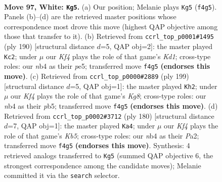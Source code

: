 \documentclass[11pt]{article}
\begin{document}
\clearpage

\begin{figure}[p]\centering
\begin{subfigure}{0.46\textwidth}\centering
\resizebox{\linewidth}{!}{%
\newchessgame
\chessboard[
  setfen={8/7k/8/7b/1n1B1K2/8/5P2/8 w - - 39 97},
  showmover=false,
  pgfstyle=straightmove, color=movearrow, markmove={f4-g5}
]}
\caption{}
\end{subfigure}\hfill
\begin{subfigure}{0.46\textwidth}\centering
\resizebox{\linewidth}{!}{%
\newchessgame
\chessboard[
  setfen={8/2k5/8/3Bp3/8/4bP2/8/3K4 w - - 13 96},
  showmover=false,
  pgfstyle=straightmove, color=movearrow, markmove={d1-c2}
]}
\caption{}
\end{subfigure}
\\[4pt]
\begin{subfigure}{0.46\textwidth}\centering
\resizebox{\linewidth}{!}{%
\newchessgame
\chessboard[
  setfen={8/2b5/1p6/1P1B4/6K1/8/8/6k1 b - - 14 100},
  showmover=false,
  pgfstyle=straightmove, color=movearrow, markmove={g1-h2}
]}
\caption{}
\end{subfigure}\hfill
\begin{subfigure}{0.46\textwidth}\centering
\resizebox{\linewidth}{!}{%
\newchessgame
\chessboard[
  setfen={8/k7/8/1K6/1P6/5B2/P7/2b5 w - - 25 91},
  showmover=false,
  pgfstyle=straightmove, color=movearrow, markmove={b5-a4}
]}
\caption{}
\end{subfigure}
\caption{\textbf{Move 97, White: \texttt{Kg5}.} (a) Our position; Melanie plays \texttt{Kg5} (\texttt{f4g5}). Panels (b)--(d) are the retrieved master positions whose correspondence most drove this move (highest QAP objective among those that transfer to it). (b) Retrieved from \texttt{ccrl\_top\_p0001\#1495} (ply 190) [structural distance $d$=5, QAP obj=2]: the master played \texttt{Kc2}; under $\mu$ our \emph{Kf4} plays the role of that game's \emph{Kd1}; cross-type roles: our \emph{n}b4 as their \emph{p}e5; transferred move \texttt{f4g5} \textbf{(endorses this move)}. (c) Retrieved from \texttt{ccrl\_top\_p0000\#2889} (ply 199) [structural distance $d$=5, QAP obj=1]: the master played \texttt{Kh2}; under $\mu$ our \emph{Kf4} plays the role of that game's \emph{Kg8}; cross-type roles: our \emph{n}b4 as their \emph{p}b5; transferred move \texttt{f4g5} \textbf{(endorses this move)}. (d) Retrieved from \texttt{ccrl\_top\_p0002\#3712} (ply 180) [structural distance $d$=7, QAP obj=1]: the master played \texttt{Ka4}; under $\mu$ our \emph{Kf4} plays the role of that game's \emph{Kb5}; cross-type roles: our \emph{n}b4 as their \emph{P}a2; transferred move \texttt{f4g5} \textbf{(endorses this move)}. Synthesis: 4 retrieved analogs transferred to \texttt{Kg5} (summed QAP objective 6, the strongest correspondence among the candidate moves); Melanie committed it via the \texttt{search} selector.}
\label{fig:thought-m192}
\end{figure}
\end{document}
